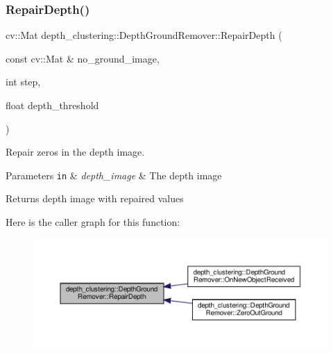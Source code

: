 \subsubsection{\texorpdfstring{Repair\+Depth()}{RepairDepth()}}
{\footnotesize\ttfamily cv\+::\+Mat depth\+\_\+clustering\+::\+Depth\+Ground\+Remover\+::\+Repair\+Depth (\begin{DoxyParamCaption}\item[{const cv\+::\+Mat \&}]{no\+\_\+ground\+\_\+image,  }\item[{int}]{step,  }\item[{float}]{depth\+\_\+threshold }\end{DoxyParamCaption})\hspace{0.3cm}{\ttfamily [protected]}}



Repair zeros in the depth image. 


\begin{DoxyParams}[1]{Parameters}
\mbox{\tt in}  & {\em depth\+\_\+image} & The depth image\\
\hline
\end{DoxyParams}
\begin{DoxyReturn}{Returns}
depth image with repaired values 
\end{DoxyReturn}
Here is the caller graph for this function\+:\nopagebreak
\begin{figure}[H]
\begin{center}
\leavevmode
\includegraphics[width=350pt]{classdepth__clustering_1_1DepthGroundRemover_a51dd313ed1bdda2188fb3a3fa1c5738e_icgraph}
\end{center}
\end{figure}
\mbox{\label{classdepth__clustering_1_1DepthGroundRemover_a81aa3a52c70223555b4f4e1800e05022}} 
